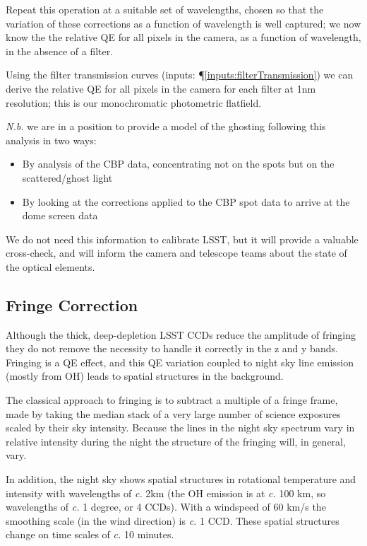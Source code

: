 \documentclass[12pt]{article}
\renewcommand{\c}{\textit{c.}\xspace}
\newcommand{\Nb}{\textit{N.b.}\xspace}
\newcommand{\inputData}[1]{(inputs: \P \ref{inputs:#1})}
\begin{document}
\begin{itemize}
  Repeat this operation at a suitable set of wavelengths, chosen so that the variation of these corrections as
  a function of wavelength is well captured; we now know the the relative QE for all pixels in the camera, as
  a function of wavelength, in the absence of a filter.
  
  Using the filter transmission curves \inputData{filterTransmission} we can derive the relative QE for all
  pixels in the camera for each filter at 1nm resolution; this is our monochromatic photometric flatfield.

  \Nb we are in a position to provide a model of the ghosting following this analysis in two ways:
  \begin{itemize}
  \item By analysis of the CBP data, concentrating not on the spots but on the scattered/ghost light
  \item By looking at the corrections applied to the CBP spot data to arrive at the dome screen data
  \end{itemize}
  We do not need this information to calibrate LSST, but it will provide a valuable cross-check, and
  will inform the camera and telescope teams about the state of the optical elements.

\end{itemize}


\subsection{Fringe Correction}
\label{sec:fringe}

Although the thick, deep-depletion LSST CCDs reduce the amplitude of fringing they do not remove the necessity
to handle it correctly in the z and y bands.  Fringing is a QE effect, and this QE variation coupled to night
sky line emission (mostly from OH) leads to spatial structures in the background.

The classical approach to fringing is to subtract a multiple of a fringe frame, made by taking the median
stack of a very large number of science exposures scaled by their sky intensity.  Because the lines in the
night sky spectrum vary in relative intensity during the night the structure of the
fringing will, in general, vary.

In addition, the night sky shows spatial structures in rotational temperature and intensity with wavelengths
of \c 2km (the OH emission is at \c 100 km, so wavelengths of \c 1 degree, or 4 CCDs).  With a
windspeed of 60 km/s the smoothing scale (in the wind direction) is \c 1 CCD.  These spatial structures change
on time scales of \c 10 minutes.
\end{document}
